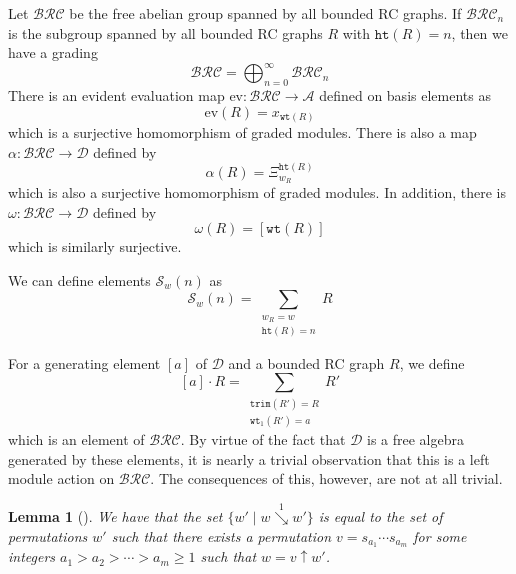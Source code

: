 \documentclass[a4paper,fleqn]{cas-sc}
\newtheorem{lemma}{Lemma}[subsection]
\theoremstyle{definition}
\theoremstyle{remark}
\numberwithin{equation}{subsection}
\newcommand{\shup}{{\uparrow}}
\newcommand{\downvar}[1]{\stackrel{#1}{\searrow}}
\newcommand{\wof}[1]{w_{#1}}
\newcommand{\wtt}{\mathtt{wt}}
\newcommand{\trm}{\mathtt{trim}}
\newcommand{\hr}{\mathtt{ht}}
\newcommand{\BRC}{\mathcal{BRC}}
\newcommand{\dsch}{\ensuremath{\Xi}}
\newcommand{\coma}{\mathcal{A}}
\newcommand{\dcoma}{\mathcal{D}}
\begin{document}
Let $\BRC$ be the free abelian group spanned by all bounded RC graphs. If $\BRC_n$ is the subgroup spanned by all bounded RC graphs $R$ with $\hr(R)=n$, then we have a grading
$$\BRC = \bigoplus_{n=0}^\infty \BRC_n$$
There is an evident evaluation map $\mathrm{ev}: \BRC\to \coma$ defined on basis elements as
$$\mathrm{ev}(R) = x_{\wtt(R)}$$
which is a surjective homomorphism of graded modules. There is also a map $\alpha:\BRC\to\dcoma$ defined by
$$\alpha(R) = \dsch_{\wof{R}}^{\hr(R)}$$
which is also a surjective homomorphism of graded modules. In addition, there is $\omega:\BRC\to \dcoma$ defined by
$$\omega(R) = [\wtt(R)]$$
which is similarly surjective.

We can define elements $\mathcal{S}_w(n)$ as
$$\mathcal{S}_w(n) = \sum_{\substack{\wof{R}=w\\\hr(R)=n}}R$$

For a generating element $[a]$ of $\dcoma$ and a bounded RC graph $R$, we define 
$$[a]\cdot R=\sum_{\substack{\trm(R') = R\\\wtt_1(R') = a}}R'$$
which is an element of $\BRC$. By virtue of the fact that $\dcoma$ is a free algebra generated by these elements, it is nearly a trivial observation that this is a left module action on $\BRC$. The consequences of this, however, are not at all trivial.

\begin{lemma}[{\cite[Corollary~3.11]{bbrc}}] \label{lemma:d1desc}
We have that the set $\{w'\mid w\downvar{1} w'\}$ is equal to the set of permutations $w'$ such that there exists a permutation $v=s_{a_1}\cdots s_{a_m}$ for some integers $a_1>a_2>\cdots>a_m\geq 1$ such that $w =v\shup{w'}$.
\end{lemma}
\end{document}
